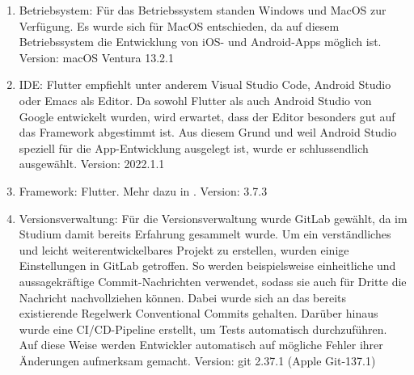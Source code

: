 \begin{enumerate}
	\item Betriebsystem: Für das Betriebssystem standen Windows und MacOS zur Verfügung. Es wurde sich für MacOS entschieden, da auf diesem Betriebssystem die Entwicklung von iOS- und Android-Apps möglich ist. Version: macOS Ventura 13.2.1%

	\item IDE: Flutter empfiehlt unter anderem Visual Studio Code, Android Studio oder Emacs als Editor\cite{tech_ideSuggestion}. Da sowohl Flutter als auch Android Studio von Google entwickelt wurden, wird erwartet, dass der Editor besonders gut auf das Framework abgestimmt ist. Aus diesem Grund und weil Android Studio speziell für die App-Entwicklung ausgelegt ist, wurde er schlussendlich ausgewählt. Version: 2022.1.1%

	\item Framework: Flutter. Mehr dazu in . Version: 3.7.3%

	\item Versionsverwaltung: 
		Für die Versionsverwaltung wurde GitLab gewählt, %
		da im Studium damit bereits Erfahrung gesammelt wurde.\newline%
		Um ein verständliches und leicht weiterentwickelbares Projekt zu erstellen, wurden einige Einstellungen in GitLab getroffen. %
			So werden beispielsweise einheitliche und aussagekräftige Commit-Nachrichten verwendet, sodass sie auch für Dritte die Nachricht nachvollziehen können. Dabei wurde sich an das bereits existierende Regelwerk \glqq Conventional Commits\grqq{}\cite{tech_conventionalCommits} gehalten. %
			Darüber hinaus wurde eine CI/CD-Pipeline erstellt, um Tests automatisch durchzuführen. Auf diese Weise werden Entwickler automatisch auf mögliche Fehler ihrer Änderungen aufmerksam gemacht. %
			Version: git 2.37.1 (Apple Git-137.1)


\end{enumerate}
